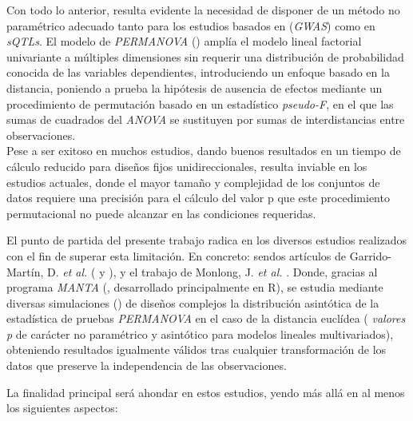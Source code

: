\documentclass[IB,BIB]{TFUOC}%
\let\oldgls=\gls
\renewcommand{\gls}[1]{{\hypersetup{linkcolor=[RGB]{0,0,0}}
  \oldgls{#1}}}
\begin{document}
Con todo lo anterior, resulta evidente la necesidad de disponer de un método no paramétrico adecuado tanto para los estudios basados en (\textit{GWAS}) como en \textit{sQTLs}. El modelo de \textit{PERMANOVA} (\cite{anderson_new_2001}) amplía el modelo lineal factorial univariante a múltiples dimensiones sin requerir una distribución de probabilidad conocida de las variables dependientes, introduciendo un enfoque basado en la distancia, poniendo a prueba la hipótesis de ausencia de efectos mediante un procedimiento de permutación basado en un estadístico \hspace{-.5em}\textit{\gls{pseudo-F}}, en el que las sumas de cuadrados del \textit{ANOVA} se sustituyen por sumas de interdistancias entre observaciones.\\
Pese a ser exitoso en muchos estudios, dando buenos resultados en un tiempo de cálculo reducido para diseños fijos unidireccionales, resulta inviable en los estudios actuales, donde el mayor tamaño y complejidad de los conjuntos de datos requiere una precisión para el cálculo del valor p que este procedimiento permutacional no puede alcanzar en las condiciones requeridas.

El punto de partida del presente trabajo radica en los diversos estudios realizados con el fin de superar esta limitación. En concreto: sendos artículos de Garrido-Martín, D. \textit{et al.} (\cite{garrido-martin_fast_2022} y \cite{garrido-martin_identification_2021}), y el trabajo de Monlong, J. \textit{et al.} \cite{monlong_identification_2014}. Donde, gracias al programa \hspace{-.5em}\textit{\gls{MANTA}} (\cite{garrido-martin_manta_2023}, desarrollado principalmente en R), se estudia mediante diversas simulaciones (\cite{garrido-martin_manta-sim_2022}) de diseños complejos la distribución asintótica de la estadística de pruebas \textit{PERMANOVA} en el caso de la distancia euclídea (\hspace{-.5em}\textit{\gls{valores p}} de carácter no paramétrico y asintótico para modelos lineales multivariados), obteniendo resultados igualmente válidos tras cualquier transformación de los datos que preserve la independencia de las observaciones.

La finalidad principal será ahondar en estos estudios, yendo más allá en al menos los siguientes aspectos:
\end{document}
